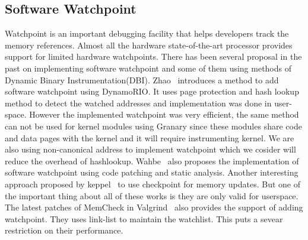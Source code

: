 \subsection{Software Watchpoint}
Watchpoint is an important debugging facility that helps developers track the memory references. Almost all the hardware state-of-the-art processor provides support for limited hardware watchpoints. There has been several proposal in the past on implementing software watchpoint and some of them using methods of Dynamic Binary Instrumentation(DBI). Zhao~\cite{Zhao:2008} introduces a method to add software watchpoint using DynamoRIO. It uses page protection and hash lookup method to detect the watched addresses and implementation was done in user-space. However the implemented watchpoint was very efficient, the same method can not be used for kernel modules using Granary since these modules share code and data pages with the kernel and it will require instrumenting kernel. We are also using non-canonical address to implement watchpoint which we cosider will reduce the overhead of hashlookup. Wahbe~\cite{Wahbe:1992} also proposes the implementation of software watchpoint using code patching and static analysis.  Another interesting approach proposed by keppel~\cite{Keppel:93a} to use checkpoint for memory updates. But one of the important thing about all of these works is they are only valid for userspace. The latest patches of MemCheck in Valgrind~\cite{Seward:2005} also provides the support of adding watchpoint. They uses link-list to maintain the watchlist. This puts a sevear restriction on their performance.   

